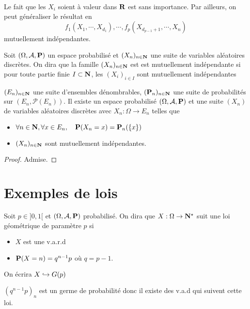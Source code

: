 \begin{rem}
    Le fait que les $X_i$ soient à valeur dans  $\R$ est sans importance. Par ailleurs, on peut généraliser le résultat en \[
        f_1(X_1,\cdots ,X_{d_1}),\cdots ,f_p(X_{d_{p-1}+1},\cdots ,X_n)
    \] 
    mutuellement indépendantes.
\end{rem}

\begin{dfn}
    Soit $(\Omega, \mathcal A, \P)$ un espace probabilisé et $(X_n)_{n\in \N}$ une suite de variables aléatoires discrètes. On dira que la famille $(X_n)_{n\in \N}$ est est mutuellement indépendante si pour toute partie finie $I\subset \N$, les $(X_i)_{i\in I}$ sont mutuellement indépendantes
\end{dfn}

\begin{thm}
    \Hyp $(E_n)_{n\in \N}$ une suite d'ensembles dénombrables, $(\P_n)_{n\in \N}$ une suite de probabilités sur $(E_n, \mathcal P(E_n))$.
    \Conc Il existe un espace probabilisé $(\Omega, \mathcal A, \P)$ et une suite $(X_n)$ de variables aléatoires discrètes avec  $X_n:\Omega\to E_n$ telles que \begin{itemize}
        \item $\forall n\in \N,\forall x\in E_n,\quad \P(X_n=x)=\P_n(\{x\} )$
        \item $(X_n)_{n\in \N}$ sont mutuellement indépendantes.
    \end{itemize}
\end{thm}

\begin{proof}
    Admise.
\end{proof}

\section{Exemples de lois}

\begin{dfn}
    Soit $p\in ]0,1[$ et $(\Omega,\mathcal  A,\P)$ probabilisé. On dira que $X:\Omega\to \N^\star$ suit une loi géométrique de paramètre $p$ si \begin{itemize}
        \item $X$ est une v.a.r.d
        \item $\P(X=n)=q^{n-1}p$ où $q=p-1$.
    \end{itemize}
    On écrira $X\suit G(p)$
\end{dfn}

\begin{rem}
    $(q^{n-1}p)_n$ est un germe de probabilité donc il existe des v.a.d qui suivent cette loi.
\end{rem}

